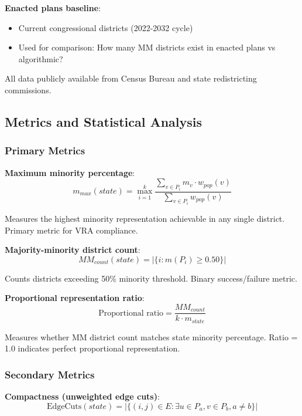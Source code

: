 \textbf{Enacted plans baseline}:
\begin{itemize}
\item Current congressional districts (2022-2032 cycle)
\item Used for comparison: How many MM districts exist in enacted plans vs algorithmic?
\end{itemize}

All data publicly available from Census Bureau and state redistricting commissions.

\subsection{Metrics and Statistical Analysis}

\subsubsection{Primary Metrics}

\textbf{Maximum minority percentage}:
\begin{equation}
m_{max}(state) = \max_{i=1}^k \frac{\sum_{v \in P_i} m_v \cdot w_{pop}(v)}{\sum_{v \in P_i} w_{pop}(v)}
\end{equation}

Measures the highest minority representation achievable in any single district. Primary metric for VRA compliance.

\textbf{Majority-minority district count}:
\begin{equation}
MM_{count}(state) = |\{i : m(P_i) \geq 0.50\}|
\end{equation}

Counts districts exceeding 50\% minority threshold. Binary success/failure metric.

\textbf{Proportional representation ratio}:
\begin{equation}
\text{Proportional ratio} = \frac{MM_{count}}{k \cdot m_{state}}
\end{equation}

Measures whether MM district count matches state minority percentage. Ratio = 1.0 indicates perfect proportional representation.

\subsubsection{Secondary Metrics}

\textbf{Compactness (unweighted edge cuts)}:
\begin{equation}
\text{EdgeCuts}(state) = |\{(i,j) \in E : \exists u \in P_a, v \in P_b, a \neq b\}|
\end{equation}

